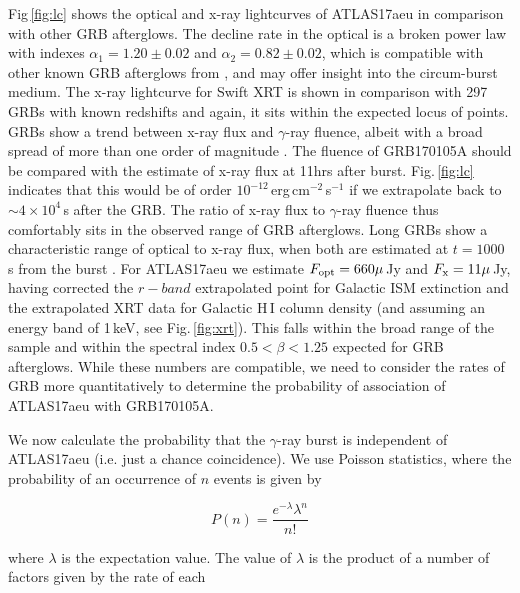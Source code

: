 \documentclass[twocolumn]{aastex61}
\begin{document}
Fig\,\ref{fig:lc}  shows the optical and x-ray lightcurves of ATLAS17aeu in comparison with other 
GRB afterglows. The decline rate in the optical is a broken power law with indexes $\alpha_1=1.20 \pm 0.02$ and $\alpha_2=0.82 \pm 0.02$, which is 
compatible with other known GRB afterglows from \cite{2009ApJ...693.1484C}, and may offer insight into the circum-burst medium. The x-ray lightcurve for Swift XRT is shown in 
comparison with 297 GRBs with known redshifts and again, it sits  within the expected locus of 
points. GRBs show a trend between x-ray flux and $\gamma$-ray fluence, albeit with a broad spread of more than 
one order of magnitude \cite[see Fig.\,12 of][]{2009MNRAS.397.1177E}. 
The fluence of GRB170105A \citep[$2.56_{-0.13}^{+0.18}\times 10^{-6}$\,erg\,cm$^{-2}$;][]{GCN20406} 
should be compared with the estimate of x-ray flux at 11hrs after burst.  Fig.\,\ref{fig:lc}  indicates that this 
would be of order $10^{-12}$\,erg\,cm$^{-2}$\,s$^{-1}$ if we extrapolate back to $\sim4\times10^4$\,s after the
GRB. The  ratio of x-ray flux to $\gamma$-ray fluence thus comfortably sits in the observed range of  GRB 
afterglows.   Long GRBs show a characteristic range of optical to x-ray flux, when both are
 estimated at $t=1000$\,s  from the burst \citep{2009ApJ...693.1484C}. For ATLAS17aeu we estimate 
$F_{\rm opt} = 660\mu$\,Jy and  $F_{\rm x} =11\mu$\,Jy, having corrected the $r-band$ extrapolated point
for Galactic ISM extinction and the extrapolated XRT data for Galactic H\,{\sc I}  column density (and assuming an energy band of 1\,keV, see Fig.\,\ref{fig:xrt}). This falls within the broad range of the \citet{2009ApJ...693.1484C} sample and within the
spectral index  $0.5<\beta<1.25$ expected for GRB afterglows. 
While these numbers are compatible, we need to consider 
the rates of GRB more quantitatively to determine the probability of association of ATLAS17aeu 
with GRB170105A. 

We now calculate the  probability that the $\gamma$-ray burst is independent of ATLAS17aeu (i.e.  just a chance coincidence). We use Poisson statistics, where the probability of an occurrence of $n$ events is given by 

\begin{equation}
P(n) = \frac{e^{-\lambda}\lambda^{n}}{n!}
\label{eqn:poiss}
\end{equation}

where $\lambda$ is the expectation value. The value of 
$\lambda$ is the product of a number of factors given by the rate of each
\end{document}
